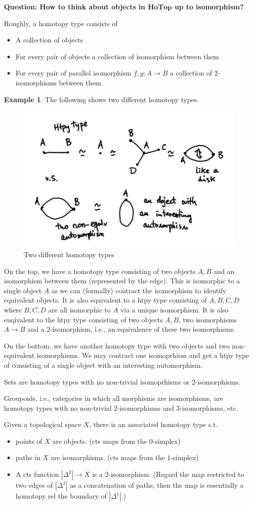 \documentclass{article}
\theoremstyle{definition}
\newtheorem{example}[defn]{Example}
\theoremstyle{remark}
\theoremstyle{plain}
\begin{document}
\textbf{Question: How to think about objects in $\mathbf{HoTop}$ up to isomorphism?}

Roughly, a homotopy type consists of 
\begin{itemize}
    \item A collection of objects
    \item For every pair of objects a collection of isomorphism between them
    \item For every pair of parallel isomorphism $f,g:A\to B$ a collection of 2-isomorphisms between them.
\end{itemize}
\begin{example}
    The following shows two different homotopy types.
    \begin{figure}[H]
        \centering
        \includegraphics[width=0.5\linewidth]{Lent/pictures/htpy_type_example.PNG}
        \caption{Two different homotopy types}
        \label{fig:1}
    \end{figure}
    On the top, we have a homotopy type consisting of two objects $A, B$ and an isomorphism between them (represented by the edge). This is isomorphic to a single object $A$ as we can (formally) contract the isomorphism to identify equivalent objects. It is also equivalent to a htpy type consisting of $A,B,C,D$ where $B,C,D$ are all isomorphic to $A$ via a unique isomorphism. It is also euqivalent to the htpy type consisting of two objects $A,B$, two isomorphisms $A\to B$ and a 2-isomorphism, i.e., an equivalence of these two isomorphisms.

    On the bottom, we have another homotopy type with two objects and two non-equivalent isomorphisms. We may contract one isomoprhism and get a htpy type of consisting of a single object with an interesting automorphism.

    Sets are homotopy types with no non-trivial isomoprhisms or 2-isomorphisms.

    Groupoids, i.e., categories in which all morphisms are isomorphisms, are homotopy types with no non-trivial 2-isomorphisms and 3-isomorphisms, etc.
\end{example}
Given a topological space $X$, there is an associated homotopy type s.t.
    \begin{itemize}
        \item points of $X$ are objects. (cts maps from the $0$-simplex)
        \item paths in $X$ are isomorphisms. (cts maps from the $1$-simplex)
        \item A cts function $|\Delta^2|\to X$ is a 2-isomorphism. (Regard the map restricted to two edges of $|\Delta^2|$ as a concatenation of paths, then the map is essentially a homotopy rel the boundary of $|\Delta^1|$.)
    \end{itemize}
\end{document}
